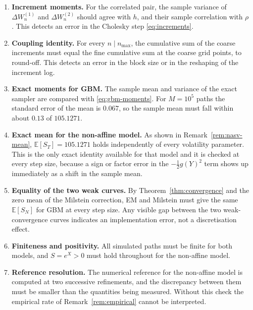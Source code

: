 \documentclass[11pt,a4paper]{article}
\theoremstyle{definition}
\theoremstyle{remark}
\begin{document}
\begin{enumerate}[leftmargin=2em]
    \item \textbf{Increment moments.} For the correlated pair, the sample
          variance of $\Delta W_n^{(1)}$ and $\Delta W_n^{(2)}$ should agree
          with $h$, and their sample correlation with $\rho$. This detects an
          error in the Cholesky step \eqref{eq:increments}.
    \item \textbf{Coupling identity.} For every $n \mid n_{\max}$, the
          cumulative sum of the coarse increments must equal the fine
          cumulative sum at the coarse grid points, to round-off. This detects
          an error in the block size or in the reshaping of the increment log.
    \item \textbf{Exact moments for GBM.} The sample mean and variance of the
          exact sampler are compared with \eqref{eq:gbm-moments}. For
          $M = 10^5$ paths the standard error of the mean is $0.067$, so the
          sample mean must fall within about $0.13$ of $105.1271$.
    \item \textbf{Exact mean for the non-affine model.} As shown in
          Remark~\ref{rem:nasv-mean}, $\mathbb{E}[S_T] = 105.1271$ holds
          independently of every volatility parameter. This is the only exact
          identity available for that model and it is checked at every step
          size, because a sign or factor error in the $-\tfrac12 g(Y)^2$ term
          shows up immediately as a shift in the sample mean.
    \item \textbf{Equality of the two weak curves.} By
          Theorem~\ref{thm:convergence} and the zero mean of the Milstein
          correction, EM and Milstein must give the same $\mathbb{E}[S_N]$ for
          GBM at every step size. Any visible gap between the two
          weak-convergence curves indicates an implementation error, not a
          discretisation effect.
    \item \textbf{Finiteness and positivity.} All simulated paths must be finite
          for both models, and $S = e^{X} > 0$ must hold throughout for the
          non-affine model.
    \item \textbf{Reference resolution.} The numerical reference for the
          non-affine model is computed at two successive refinements, and the
          discrepancy between them must be smaller than the quantities being
          measured. Without this check the empirical rate of
          Remark~\ref{rem:empirical} cannot be interpreted.
\end{enumerate}
\end{document}
